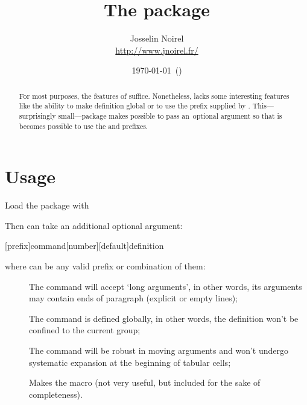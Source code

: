 \documentclass{article}
\title  {The \pack{xnewcommand} package}
\author {Josselin Noirel\\\url{http://www.jnoirel.fr/}}
\date   {%
  \getfileinfo{xnewcommand.sty}%
  \expandafter \setdate \filedate
  \today\ (\fileversion)}
\begin{document}
\maketitle

\tableofcontents

\begin{abstract}
  For most purposes, the features of  suffice.
  Nonetheless,  lacks some interesting features like
  the ability to make definition global or to use the 
  prefix supplied by \eTeX.  This---surprisingly small---package makes
  possible to pass an~optional argument  so that is
  becomes possible to use the  and 
  prefixes.
\end{abstract}

\section{Usage}

Load the package with
%
\begin{texcode}
\end{texcode}
%
Then  can take an additional optional argument:
%
\begin{texcode}
  [prefix]{command}[number][default]{definition}
\end{texcode}
%
where  can be any valid prefix or combination of them:
%
\begin{description}
\item []       The command will accept `long arguments', in
                         other words, its arguments may contain ends
                         of paragraph (explicit  or empty
                         lines);

\item []     The command is defined globally, in other
                         words, the definition won't be confined to
                         the current group;

\item []  The command will be robust in moving
                         arguments and won't undergo systematic
                         expansion at the beginning of tabular cells;

\item []      Makes the macro  (not very useful,
                         but included for the sake of completeness).
\end{description}
\end{document}
